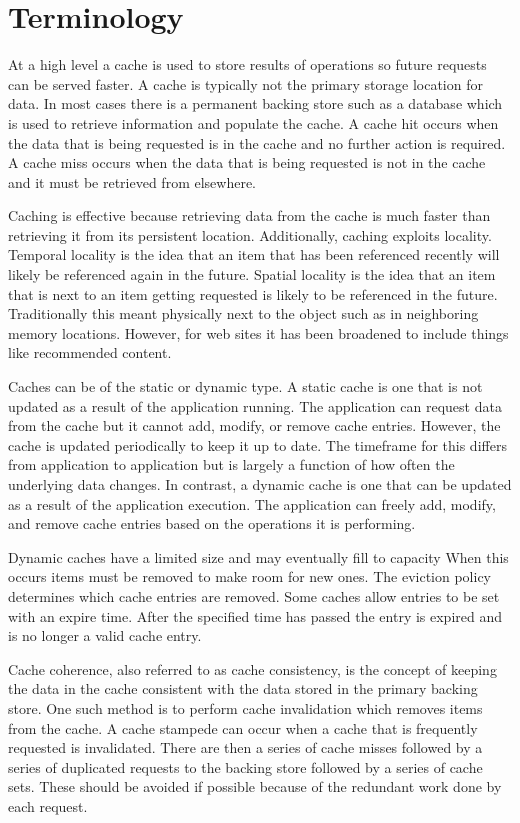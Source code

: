\documentclass[12pt]{article}
\begin{document}
\section{Terminology}
At a high level a cache is used to store results of operations so future requests can be served faster.
A cache is typically not the primary storage location for data.
In most cases there is a permanent backing store such as a database which is used to retrieve information and populate the cache.
A cache hit occurs when the data that is being requested is in the cache and no further action is required.
A cache miss occurs when the data that is being requested is not in the cache and it must be retrieved from elsewhere.

Caching is effective because retrieving data from the cache is much faster than retrieving it from its persistent location.
Additionally, caching exploits locality.
Temporal locality is the idea that an item that has been referenced recently will likely be referenced again in the future.
Spatial locality is the idea that an item that is next to an item getting requested is likely to be referenced in the future.
Traditionally this meant physically next to the object such as in neighboring memory locations.
However, for web sites it has been broadened to include things like recommended content.

Caches can be of the static or dynamic type.
A static cache is one that is not updated as a result of the application running.
The application can request data from the cache but it cannot add, modify, or remove cache entries.
However, the cache is updated periodically to keep it up to date.
The timeframe for this differs from application to application but is largely a function of how often the underlying data changes.
In contrast, a dynamic cache is one that can be updated as a result of the application execution.
The application can freely add, modify, and remove cache entries based on the operations it is performing.

Dynamic caches have a limited size and may eventually fill to capacity
When this occurs items must be removed to make room for new ones.
The eviction policy determines which cache entries are removed.
Some caches allow entries to be set with an expire time.
After the specified time has passed the entry is expired and is no longer a valid cache entry.

Cache coherence, also referred to as cache consistency, is the concept of keeping the data in the cache consistent with the data stored in the primary backing store.
One such method is to perform cache invalidation which removes items from the cache.
A cache stampede can occur when a cache that is frequently requested is invalidated.
There are then a series of cache misses followed by a series of duplicated requests to the backing store followed by a series of cache sets.
These should be avoided if possible because of the redundant work done by each request.
\end{document}
